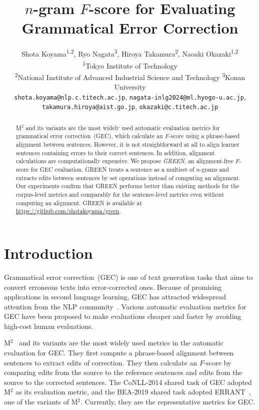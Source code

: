 \documentclass[11pt]{article}
\title{$n$-gram $F$-score for Evaluating Grammatical Error Correction}
\author{
    Shota Koyama\textsuperscript{1,2},
    Ryo Nagata\textsuperscript{3},
    Hiroya Takamura\textsuperscript{2},
    Naoaki Okazaki\textsuperscript{1,2} \\
    \textsuperscript{1}Tokyo Institute of Technology \\
    \textsuperscript{2}National Institute of Advanced Industrial Science and Technology
    \textsuperscript{3}Konan University \\
    \texttt{shota.koyama@nlp.c.titech.ac.jp},
    \texttt{nagata-inlg2024@ml.hyogo-u.ac.jp}, \\
    \texttt{takamura.hiroya@aist.go.jp},
    \texttt{okazaki@c.titech.ac.jp}
}
\begin{document}
\maketitle
\begin{abstract}
M${}^2$ and its variants are the most widely used automatic evaluation metrics for grammatical error correction~(GEC), which calculate an $F$-score using a phrase-based alignment between sentences.
However, it is not straightforward at all to align learner sentences containing errors to their correct sentences. In addition, alignment calculations are computationally expensive.
We propose \emph{GREEN}, an alignment-free $F$-score for GEC evaluation.
GREEN treats a sentence as a multiset of $n$-grams and extracts edits between sentences by set operations instead of computing an alignment.
Our experiments confirm that GREEN performs better than existing methods for the corpus-level metrics and comparably for the sentence-level metrics even without computing an alignment.
GREEN is available at \url{https://github.com/shotakoyama/green}.
\end{abstract}

\section{Introduction}
\label{sec:introduction}

Grammatical error correction~(GEC) is one of text generation tasks that aims to convert erroneous texts into error-corrected ones.
Because of promising applications in second language learning, GEC has attracted widespread attention from the NLP community~\citep{chollampatt-ng-2018-neural,zhao-etal-2019-improving,sun-etal-2021-instantaneous,kaneko-etal-2022-interpretability,zhou-etal-2023-improving-seq2seq}.
Various automatic evaluation metrics for GEC have been proposed to make evaluations cheaper and faster by avoiding high-cost human evaluations.

M${}^2$~\citep{dahlmeier-ng-2012-better} and its variants are the most widely used metrics in the automatic evaluation for GEC.
They first compute a phrase-based alignment between sentences to extract edits of correction.
They then calculate an $F$-score by comparing edits from the source to the reference sentences and edits from the source to the corrected sentences.
The CoNLL-2014 shared task of GEC adopted M${}^2$ as its evaluation metric, and the BEA-2019 shared task adopted ERRANT~\citep{bryant-etal-2017-automatic}, one of the variants of M${}^2$. Currently, they are the representative metrics for GEC.
\end{document}
